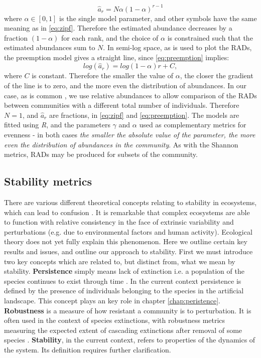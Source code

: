 \begin{equation}
\hat{a}_r = N\alpha(1-\alpha)^{r-1}
\label{eq:preemption}
\end{equation}
%  
where $\alpha \in [0,1]$ is the single model parameter, and other symbols have the same meaning as in \eqref{eq:zipf}. Therefore the estimated abundance decreases by a fraction $(1-\alpha)$ for each rank, and the choice of $\alpha$ is constrained such that the estimated abundances sum to $N$. In semi-log space, as is used to plot the RADs, the preemption model gives a straight line, since \eqref{eq:preemption} implies:
\begin{equation}
log\left(\hat{a}_r\right) = log\left(1-\alpha\right)r + C,
\label{eq:preemption}
\end{equation}
%  
where $C$ is constant. Therefore the smaller the value of $\alpha$, the closer the gradient of the line is to zero, and the more even the distribution of abundances. In our case, as is common \cite{oksanen2007vegan}, we use relative abundances to allow comparison of the RADs between communities with a different total number of individuals. Therefore $N=1$, and $\hat{a}_r$ are fractions, in \eqref{eq:zipf} and \eqref{eq:preemption}. The models are fitted using \emph{R}, and the parameters $\gamma$ and $\alpha$ used as complementary metrics for evenness - in both cases \emph{the smaller the absolute value of the parameter, the more even the distribution of abundances in the community}. As with the Shannon metrics, RADs may be produced for subsets of the community.   


\subsection{Stability metrics}
\label{sec:def_stability_metrics}

There are various different theoretical concepts relating to stability in ecosystems, which can lead to confusion \cite{arnoldi2015,mumby2014ecological}. It is remarkable that complex ecosystems are able to function with relative consistency in the face of extrinsic variability and perturbations (e.g. due to environmental factors and human activity). Ecological theory does not yet fully explain this phenomenon. Here we outline certain key results and issues, and outline our approach to stability. First we must introduce two key concepts which are related to, but distinct from, what we mean by stability. \textbf{Persistence} simply means lack of extinction i.e. a population of the species continues to exist through time \cite{dytham1995effect}. In the current context persistence is defined by the presence of individuals belonging to the species in the artificial landscape. This concept plays an key role in chapter \ref{chap:peristence}. \textbf{Robustness} is a measure of how resistant a community is to perturbation. It is often used in the context of species extinctions, with robustness metrics measuring the expected extent of cascading extinctions after removal of some species \cite{evans2013robustness}. \textbf{Stability}, in the current context, refers to properties of the dynamics of the system. Its definition requires further clarification.    

